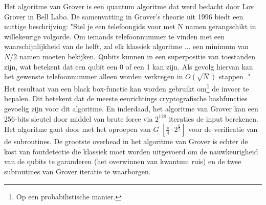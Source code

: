\documentclass[11pt]{article}
\begin{document}
Het algoritme van Grover is een quantum algoritme dat werd bedacht door Lov Grover in Bell Labo. De samenvatting in Grover's theorie uit 1996 biedt een nuttige beschrijving: "Stel je een telefoongids voor met N namen gerangschikt in willekeurige volgorde. Om iemands telefoonnummer te vinden met een waarschijnlijkheid van de helft, zal elk klassiek algoritme ... een minimum van $N/2$ namen moeten bekijken. Qubits kunnen in een superpositie van toestanden zijn, wat betekent dat een qubit een 0 of een 1 kan zijn. Als gevolg hiervan kan het gewenste telefoonnummer alleen worden verkregen in $O(\sqrt{N})$ stappen \cite{lovgrover}."\\ 

\noindent Het resultaat van een black box-functie kan worden gebruikt om\footnote{Op een probabilistische manier.} de invoer te bepalen.
Dit betekent dat de meeste eenrichtings cryptografische hashfuncties gevoelig zijn voor dit algoritme. 
En inderdaad, het algoritme van Grover kan een 256-bits sleutel door middel van brute force via $2^{128}$ iteraties de input berekenen.\\ 

\noindent Het algoritme gaat door met het oproepen van $G$ $[\frac{\pi}{4} \cdot 2^{\frac{k}{2}}]$ voor de verificatie van de subroutines. De grootste overhead in het algoritme van Grover is echter de kost van foutdetectie die klassiek moet worden uitgevoerd om de nauwkeurigheid van de qubits te garanderen (het overwinnen van kwantum ruis) en de twee subroutines van Grover iteratie te waarborgen.\\
\end{document}
